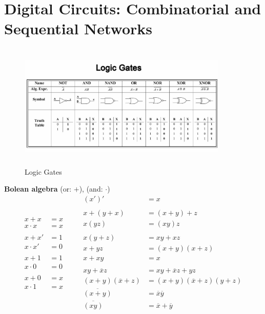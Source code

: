 \documentclass{article}
\begin{document}
\newpage
\section{Digital Circuits: Combinatorial and Sequential Networks}
\begin{figure}[h]
    \vspace{10mm}
    \centering
    \includegraphics[width=10cm, height=6cm]{image/logic-gates.jpeg}
    \caption{Logic Gates}
\end{figure}

\textbf{Bolean algebra}
(or: $+$), (and: $\cdot$)
\[
\begin{aligned}
  x + x       &= x \\
  x \cdot x   &= x \\
  &\quad   \\
  x + x'      &= 1 \\
  x \cdot x'  &= 0 \\
  &\quad   \\
  x + 1       &= 1 \\
  x \cdot 0   &= 0 \\
  &\quad   \\
  x + 0       &= x \\
  x \cdot 1   &= x \\
\end{aligned} \qquad
\begin{aligned}
  (x')'       &= x \\
  &\quad   \\
  x + (y + x) &= (x +y) + z \\
  x(yz)       &= (xy)z \\
  &\quad   \\
  x(y+z)      &= xy+xz \\
  x + yz      &= (x+y)(x+z)   \\
  x + xy      &= x  \\
  &\quad   \\
  xy+\overline{x}z &= xy+\overline{x}z +yz  \\
  (x+y)(\overline{x}+z) &= (x+y)(\overline{x}+z)(y+z)   \\
  \overline{(x+y)} &= \overline{x}\overline{y}  \\
  \overline{(xy)} &= \overline{x}+\overline{y}  \\
\end{aligned}
\] 
\end{document}
